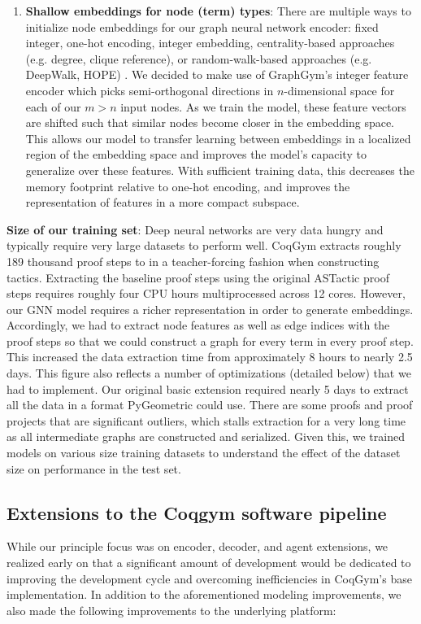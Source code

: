 \documentclass{article}
\begin{document}
\begin{enumerate}
    \item \textbf{Shallow embeddings for node (term) types}: There are multiple ways to initialize node embeddings for our graph neural network encoder: fixed integer, one-hot encoding, integer embedding, centrality-based approaches (e.g. degree, clique reference), or random-walk-based approaches (e.g. DeepWalk, HOPE) \cite{emb}. We decided to make use of GraphGym's integer feature encoder \cite{graphgym} which picks semi-orthogonal directions in $n$-dimensional space for each of our $m>n$ input nodes. As we train the model, these feature vectors are shifted such that similar nodes become closer in the embedding space. This allows our model to transfer learning between embeddings in a localized region of the embedding space and improves the model's capacity to generalize over these features. With sufficient training data, this decreases the memory footprint relative to one-hot encoding, and improves the representation of features in a more compact subspace. 
\end{enumerate}

\textbf{Size of our training set}: Deep neural networks are very data hungry and typically require very large datasets to perform well. CoqGym extracts roughly 189 thousand proof steps to in a teacher-forcing fashion when constructing tactics. Extracting the baseline proof steps using the original ASTactic proof steps requires roughly four CPU hours multiprocessed across 12 cores. However, our GNN model requires a richer representation in order to generate embeddings. Accordingly, we had to extract node features as well as edge indices with the proof steps so that we could construct a graph for every term in every proof step. This increased the data extraction time from approximately 8 hours to nearly 2.5 days. This figure also reflects a number of optimizations (detailed below) that we had to implement. Our original basic extension required nearly 5 days to extract all the data in a format PyGeometric could use. There are some proofs and proof projects that are significant outliers, which stalls extraction for a very long time as all intermediate graphs are constructed and serialized. Given this, we trained models on various size training datasets to understand the effect of the dataset size on performance in the test set.   


\subsection{Extensions to the Coqgym software pipeline}
While our principle focus was on encoder, decoder, and agent extensions, we realized early on that a significant amount of development would be dedicated to improving the development cycle and overcoming inefficiencies in CoqGym's base implementation. In addition to the aforementioned modeling improvements, we also made the following improvements to the underlying platform:
\end{document}
